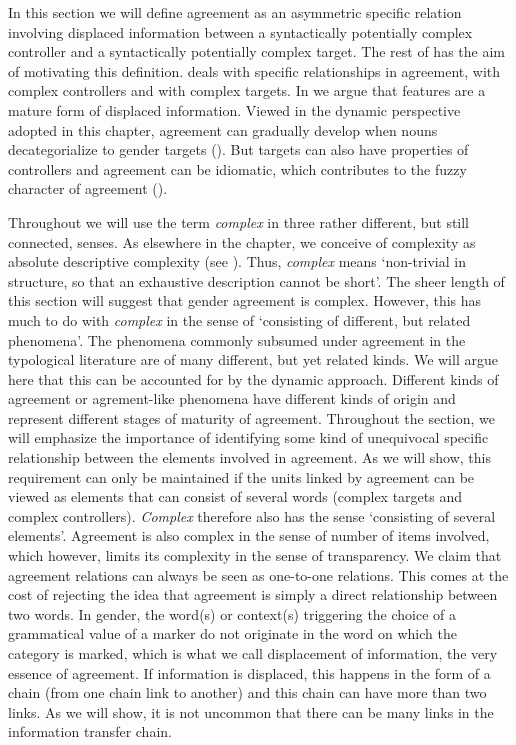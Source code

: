\documentclass[output=collectionpaper]{langsci/langscibook}
\begin{document}
In this section we will define agreement as an asymmetric specific relation involving displaced information between a syntactically potentially complex controller and a syntactically potentially complex target. The rest of  has the aim of motivating this definition.  deals with specific relationships in agreement,  with complex controllers and  with complex targets. In  we argue that features are a mature form of displaced information. Viewed in the dynamic perspective adopted in this chapter, agreement can gradually develop when nouns decategorialize to gender targets (). But targets can also have properties of controllers and agreement can be idiomatic, which contributes to the fuzzy character of agreement ().

Throughout  we will use the term \textit{complex} in three rather different, but still connected, senses. As elsewhere in the chapter, we conceive of complexity as absolute descriptive complexity (see ). Thus, \textit{complex} means `non-trivial in structure, so that an exhaustive description cannot be short'. The sheer length of this section will suggest that gender agreement is complex. However, this has much to do with \textit{complex} in the sense of `consisting of different, but related phenomena'. The phenomena commonly subsumed under agreement in the typological literature are of many different, but yet related kinds. We will argue here that this can be accounted for by the dynamic approach. Different kinds of agreement or agrement-like phenomena have different kinds of origin and represent different stages of maturity of agreement. Throughout the section, we will emphasize the importance of identifying some kind of unequivocal specific relationship between the elements involved in agreement. As we will show, this requirement can only be maintained if the units linked by agreement can be viewed as elements that can consist of several words (complex targets and complex controllers). \textit{Complex} therefore also has the sense `consisting of several elements'. Agreement is also complex in the sense of number of items involved, which however, limits its complexity in the sense of transparency. We claim that agreement relations can always be seen as one-to-one relations. This comes at the cost of rejecting the idea that agreement is simply a direct relationship between two words. In gender, the word(s) or context(s) triggering the choice of a grammatical value of a marker do not originate in the word on which the category is marked, which is what we call displacement of information, the very essence of agreement. If information is displaced, this happens in the form of a chain (from one chain link to another) and this chain can have more than two links. As we will show, it is not uncommon that there can be many links in the information transfer chain.
\end{document}
